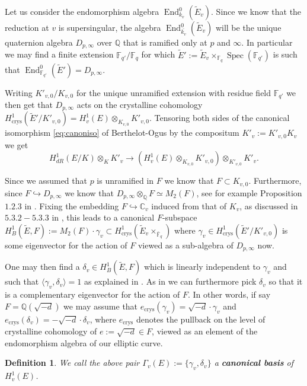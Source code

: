 \documentclass[12pt,twoside,a4paper]{article}
\theoremstyle{plain}%
\newtheorem{definition}[theorem]{Definition} %
\DeclareMathOperator{\End}{End}
\DeclareMathOperator{\spec}{Spec}
\DeclareMathOperator{\crys}{crys}
\newcommand{\C}{\mathbb{C}}
\newcommand{\Q}{\mathbb{Q}}
\newcommand{\F}{\mathbb{F}}
\begin{document}
Let us consider the endomorphism algebra $\End^{0}_{k_v}(\tilde{E}_v)$. Since we know that the reduction at $v$ is supersingular, the algebra $\End^{0}_{\bar{k_v}}(\tilde{E}_v)$ will be the unique quaternion algebra $D_{p,\infty}$ over $\Q$ that is ramified only at $p$ and $\infty$. In particular we may find a finite extension $\F_{q'}/\F_q$ for which $\tilde{E}':=\tilde{E}_{v}\times_{\F_q} \spec(\F_{q'})$ is such that $\End^{0}_{\F_{q'}}(\tilde{E}')=D_{p,\infty}$. 

Writing $K'_{v,0}/K_{v,0}$ for the unique unramified extension with residue field $\F_{q'}$ we then get that $D_{p,\infty}$ acts on the crystalline cohomology $H^1_{\crys}(\tilde{E}'/K'_{v,0})=H^1_{v}(E)\otimes_{K_{v,0}} K'_{v,0}$. Tensoring both sides of the canonical isomorphism \eqref{eq:canoniso} of Berthelot-Ogus by the compositum $K'_v:=K'_{v,0}K_v$ we get \begin{equation}
	H^1_{dR}(E/K)\otimes_{K} K'_v\rightarrow (H^1_{v}(E)\otimes_{K_{v,0}} K'_{v,0})\otimes_{K'_{v,0}} K'_{v}.
\end{equation}

Since we assumed that $p$ is unramified in $F$ we know that $F\subset K_{v,0}$. Furthermore, since $F\hookrightarrow D_{p,\infty}$ we know that $D_{p,\infty}\otimes_{\Q} F\simeq M_2(F)$, see for example Proposition $1.2.3$ in \cite{szamuely}. Fixing the embedding $F\hookrightarrow \C_v$ induced from that of $K_v$, as discussed in $5.3.2-5.3.3$ in \cite{andremsj}, this leads to a canonical $F$-subspace $H^1_B(\tilde{E},F):= M_2(F)\cdot \gamma_v\subset H^1_{\crys}(\tilde{E}_v\times_{\bar{\F}_{q}})$ where $\gamma_v\in H^1_{\crys}(\tilde{E}'/K'_{v,0})$ is some eigenvector for the action of $F$ viewed as a sub-algebra of $D_{p,\infty}$ now. 

One may then find a $\delta_v\in H^1_B(\tilde{E},F)$ which is linearly independent to $\gamma_v$ and such that $\langle \gamma_v,\delta_v\rangle=1$ as explained in \cite{andremots}. As in \cite{andremots} we can furthermore pick $\delta_v$ so that it is a complementary eigenvector for the action of $F$. In other words, if say $F=\Q(\sqrt{-d})$ we may assume that $e_{\crys}(\gamma_v)=\sqrt{-d}\cdot \gamma_v$ and $e_{\crys}(\delta_v)=-\sqrt{-d}\cdot \delta_v$, where $e_{\crys}$ denotes the pullback on the level of crystalline cohomology of $e:=\sqrt{-d}\in F$, viewed as an element of the endomorphism algebra of our elliptic curve.

\begin{definition}\label{defcansuper}
	We call the above pair $\Gamma_v(E):=\{\gamma_v,\delta_v\}$ a \textbf{canonical basis} of $H^1_v(E)$.
\end{definition}
\end{document}

